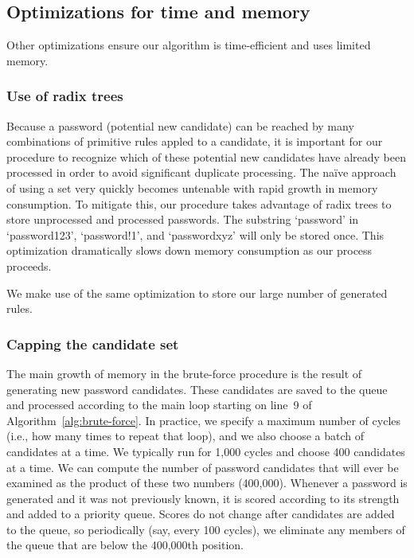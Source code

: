 \documentclass[letterpaper,twocolumn,10pt]{article}
\begin{document}
\subsection{Optimizations for time and memory}

Other optimizations ensure our algorithm is time-efficient and uses limited
memory.

\subsubsection{Use of radix trees}

Because a password (potential new candidate) can be reached by many
combinations of primitive rules appled to a candidate, it is important for our
procedure to recognize which of these potential new candidates have already been
processed in order to avoid significant duplicate processing. The naïve approach
of using a set very quickly becomes untenable with rapid growth in memory
consumption. To mitigate this, our procedure takes advantage of radix trees to
store unprocessed and processed passwords. The substring `password' in
`password123', `password!1', and `passwordxyz' will only be stored once. This
optimization dramatically slows down memory consumption as our process proceeds.

We make use of the same optimization to store our large number of generated
rules.

\subsubsection{Capping the candidate set}

The main growth of memory in the brute-force procedure is the result of
generating new password candidates. These candidates are saved to the queue and
processed according to the main loop starting on line~9 of
Algorithm~\ref{alg:brute-force}. In practice, we specify a maximum number of
cycles (i.e., how many times to repeat that loop), and we also choose a batch
of candidates at a time. We typically run for 1,000 cycles and choose 400
candidates at a time. We can compute the number of password candidates that
will ever be examined as the product of these two numbers (400,000). Whenever a
password is generated and it was not previously known, it is scored according
to its strength and added to a priority queue. Scores do not change after
candidates are added to the queue, so periodically (say, every 100 cycles), we
eliminate any members of the queue that are below the 400,000th position.
\end{document}
